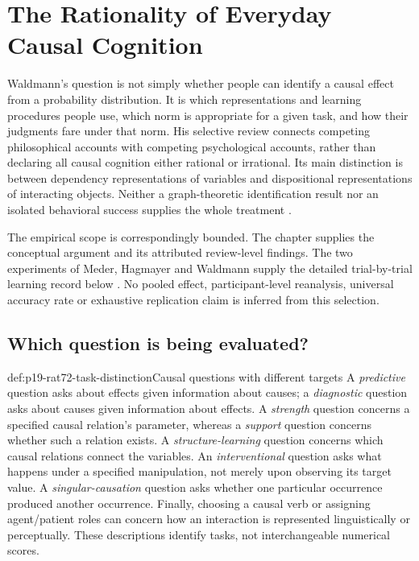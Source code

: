 \chapter{The Rationality of Everyday Causal Cognition}
\label{sec:p19-rationality-7-2}

Waldmann's question is not simply whether people can identify a causal
effect from a probability distribution. It is which representations and
learning procedures people use, which norm is appropriate for a given
task, and how their judgments fare under that norm. His selective review
connects competing philosophical accounts with competing psychological
accounts, rather than declaring all causal cognition either rational or
irrational. Its main distinction is between dependency representations
of variables and dispositional representations of interacting objects.
Neither a graph-theoretic identification result nor an isolated behavioral
success supplies the whole treatment
\cite[chapter~7.2, pp.~439--448]{Waldmann2021EverydayCausal}.

The empirical scope is correspondingly bounded. The chapter supplies
the conceptual argument and its attributed review-level findings. The
two experiments of Meder, Hagmayer and Waldmann supply the detailed
trial-by-trial learning record below
\cite{MederHagmayerWaldmann2008Interventional}.
No pooled effect, participant-level reanalysis, universal accuracy rate
or exhaustive replication claim is inferred from this selection.

\section{Which question is being evaluated?}
\label{sec:p19-rat72-tasks}

\begin{hbdefinition}{def:p19-rat72-task-distinction}{Causal questions with different targets}
A \emph{predictive} question asks about effects given information about
causes; a \emph{diagnostic} question asks about causes given information
about effects. A \emph{strength} question concerns a specified causal
relation's parameter, whereas a \emph{support} question concerns whether
such a relation exists. A \emph{structure-learning} question concerns
which causal relations connect the variables. An \emph{interventional}
question asks what happens under a specified manipulation, not merely
upon observing its target value. A \emph{singular-causation} question
asks whether one particular occurrence produced another occurrence.
Finally, choosing a causal verb or assigning agent/patient roles can
concern how an interaction is represented linguistically or perceptually.
These descriptions identify tasks, not interchangeable numerical scores.
\end{hbdefinition}

